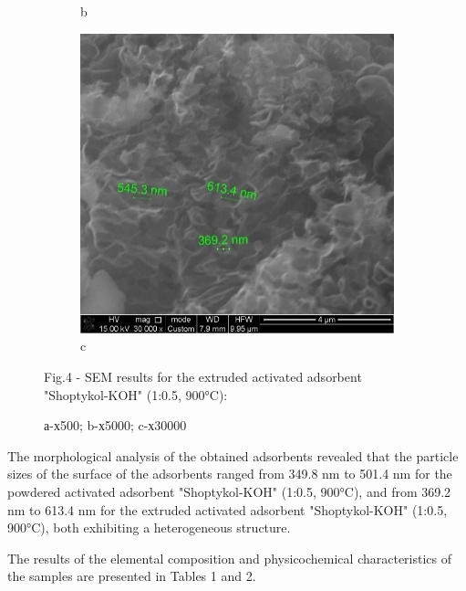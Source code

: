 \begin{figure}[H]
\begin{subfigure}[b]{0.32\textwidth}
        \caption*{b}
    \end{subfigure}
    \hfill
    \begin{subfigure}[b]{0.32\textwidth}
        \centering
        \includegraphics[width=\textwidth,height=\textwidth]{media/chem2/image20}
        \caption*{c}
    \end{subfigure}
    \caption*{Fig.4 - SEM results for the extruded activated adsorbent "Shoptykol-KOH" (1:0.5, 900°C):}
    \caption*{а-х500; b-х5000; c-х30000}
\end{figure}

\begin{multicols}{2}
The morphological analysis of the obtained adsorbents revealed that the
particle sizes of the surface of the adsorbents ranged from 349.8 nm to
501.4 nm for the powdered activated adsorbent "Shoptykol-KOH" (1:0.5,
900°C), and from 369.2 nm to 613.4 nm for the extruded activated
adsorbent "Shoptykol-KOH" (1:0.5, 900°C), both exhibiting a
heterogeneous structure.

The results of the elemental composition and physicochemical
characteristics of the samples are presented in Tables 1 and 2.
\end{multicols}


